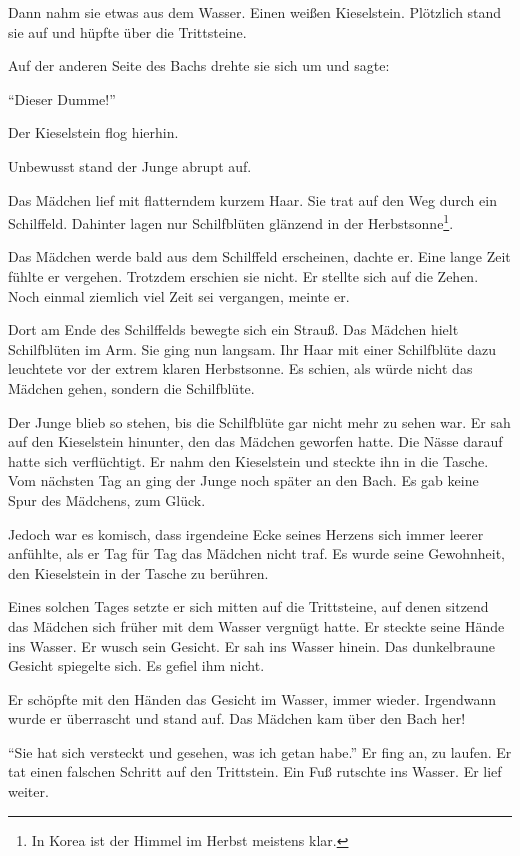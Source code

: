 \documentclass[prd,a4paper,12pt,tightenlines,notitlepage,nofootinbib]{revtex4-1}
\begin{document}
Dann nahm sie etwas aus dem Wasser.
Einen weißen Kieselstein.  Plötzlich stand sie auf und hüpfte über die
Trittsteine.

Auf der anderen Seite des Bachs drehte sie sich um und
sagte:

"`Dieser Dumme!"'

Der Kieselstein flog hierhin.

Unbewusst stand der Junge abrupt auf.

Das Mädchen lief mit flatterndem kurzem
Haar.  Sie trat auf den Weg durch ein Schilffeld.  Dahinter lagen nur
Schilfblüten glänzend in der Herbstsonne\footnote{In Korea ist
der Himmel im Herbst meistens klar.}.

Das Mädchen werde bald aus dem
Schilffeld erscheinen, dachte er.  Eine lange Zeit fühlte er vergehen.
Trotzdem erschien sie nicht.  Er stellte sich auf die Zehen.  Noch einmal
ziemlich viel Zeit sei vergangen, meinte er.

Dort am Ende des
Schilffelds bewegte sich ein Strauß.  Das Mädchen hielt Schilfblüten
im Arm.  Sie ging nun langsam.  Ihr Haar mit einer Schilfblüte dazu
leuchtete vor der extrem klaren Herbstsonne.  Es schien, als würde
nicht das Mädchen gehen, sondern die Schilfblüte.

Der Junge blieb
so stehen, bis die Schilfblüte gar nicht mehr zu sehen war.  Er sah
auf den Kieselstein hinunter, den das Mädchen geworfen hatte.  Die Nässe darauf
hatte sich verflüchtigt.  Er nahm den Kieselstein und steckte ihn in die
Tasche.
\\

Vom nächsten Tag an ging der Junge noch später an den Bach.  Es gab
keine Spur %
des Mädchens, zum Glück.

Jedoch war es komisch, dass
irgendeine Ecke seines Herzens sich immer leerer anfühlte, als er Tag für
Tag das Mädchen nicht traf.  Es wurde seine Gewohnheit, den
Kieselstein in der Tasche zu berühren.

Eines solchen Tages setzte er
sich mitten auf die Trittsteine, auf denen sitzend das Mädchen sich früher mit
dem Wasser vergnügt hatte.  Er steckte seine Hände ins Wasser.
Er wusch sein Gesicht.  Er sah ins Wasser hinein.  Das dunkelbraune
Gesicht spiegelte sich.  Es gefiel ihm nicht.

Er schöpfte mit den
Händen das Gesicht im Wasser, immer wieder.  Irgendwann wurde er
überrascht und stand auf.  Das Mädchen kam über den Bach her!

"`Sie hat sich versteckt und gesehen, was ich getan habe."'
Er fing an,
zu laufen.  Er tat einen falschen Schritt auf den Trittstein.  Ein
Fuß rutschte ins Wasser.  Er lief weiter.
\end{document}
